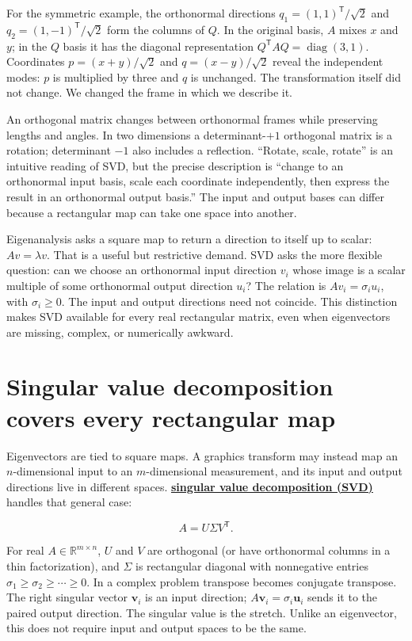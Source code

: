 For the symmetric example, the orthonormal directions \(q_1=(1,1)^\mathsf T/\sqrt2\) and \(q_2=(1,-1)^\mathsf T/\sqrt2\) form the columns of \(Q\). In the original basis, \(A\) mixes \(x\) and \(y\); in the \(Q\) basis it has the diagonal representation \(Q^\mathsf T A Q=\operatorname{diag}(3,1)\). Coordinates \(p=(x+y)/\sqrt2\) and \(q=(x-y)/\sqrt2\) reveal the independent modes: \(p\) is multiplied by three and \(q\) is unchanged. The transformation itself did not change. We changed the frame in which we describe it.

An orthogonal matrix changes between orthonormal frames while preserving lengths and angles. In two dimensions a determinant-\(+1\) orthogonal matrix is a rotation; determinant \(-1\) also includes a reflection. ``Rotate, scale, rotate'' is an intuitive reading of SVD, but the precise description is ``change to an orthonormal input basis, scale each coordinate independently, then express the result in an orthonormal output basis.'' The input and output bases can differ because a rectangular map can take one space into another.

Eigenanalysis asks a square map to return a direction to itself up to scalar: \(Av=\lambda v\). That is a useful but restrictive demand. SVD asks the more flexible question: can we choose an orthonormal input direction \(v_i\) whose image is a scalar multiple of some orthonormal output direction \(u_i\)? The relation is \(Av_i=\sigma_i u_i\), with \(\sigma_i\ge0\). The input and output directions need not coincide. This distinction makes SVD available for every real rectangular matrix, even when eigenvectors are missing, complex, or numerically awkward.

\section{Singular value decomposition covers every rectangular map}\label{02-foundations-ii-ch024-singular-value-decomposition-covers-every-rectangular-map}

Eigenvectors are tied to square maps. A graphics transform may instead map an \(n\)-dimensional input to an \(m\)-dimensional measurement, and its input and output directions live in different spaces. \textbf{\hyperref[02-foundations-ii-ch024-full-thin-and-compact-shapes-for-tall-and-wide-matrices]{singular value decomposition (SVD)}} handles that general case:

\[
A=U\Sigma V^\mathsf T.
\]

For real \(A\in\mathbb R^{m\times n}\), \(U\) and \(V\) are orthogonal (or have orthonormal columns in a thin factorization), and \(\Sigma\) is rectangular diagonal with nonnegative entries \(\sigma_1\ge\sigma_2\ge\cdots\ge0\). In a complex problem transpose becomes conjugate transpose. The right singular vector \(\mathbf v_i\) is an input direction; \(A\mathbf v_i=\sigma_i\mathbf u_i\) sends it to the paired output direction. The singular value is the stretch. Unlike an eigenvector, this does not require input and output spaces to be the same.

